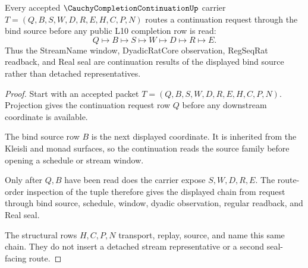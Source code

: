 \begin{theorem}
\label{thm:cauchy-completion-continuation-bind-route}
Every accepted $\CauchyCompletionContinuationUp$ carrier $T=(Q,B,S,W,D,R,E,H,C,P,N)$ routes a continuation request through the bind source before any public L10 completion row is read:
$$
Q \longmapsto B \longmapsto S \longmapsto W \longmapsto D \longmapsto R \longmapsto E .
$$
Thus the StreamName window, DyadicRatCore observation, RegSeqRat readback, and Real seal are continuation results of the displayed bind source rather than detached representatives.
\end{theorem}
\begin{proof}
Start with an accepted packet $T=(Q,B,S,W,D,R,E,H,C,P,N)$. Projection gives the continuation request row $Q$ before any downstream coordinate is available.

The bind source row $B$ is the next displayed coordinate. It is inherited from the Kleisli and monad surfaces, so the continuation reads the source family before opening a schedule or stream window.

Only after $Q,B$ have been read does the carrier expose $S,W,D,R,E$. The route-order inspection of the tuple therefore gives the displayed chain from request through bind source, schedule, window, dyadic observation, regular readback, and Real seal.

The structural rows $H,C,P,N$ transport, replay, source, and name this same chain. They do not insert a detached stream representative or a second seal-facing route.
\end{proof}

